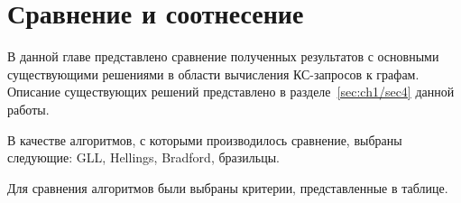 \chapter{Сравнение и соотнесение}\label{ch:ch6}
В данной главе представлено сравнение полученных результатов с основными существующими решениями в области вычисления КС-запросов к графам. Описание существующих решений представлено 
в разделе~\ref{sec:ch1/sec4} данной работы.

В качестве алгоритмов, с которыми производилось сравнение, выбраны следующие: GLL, Hellings, Bradford, бразильцы.

Для сравнения алгоритмов были выбраны критерии, представленные в таблице. 

\clearpage